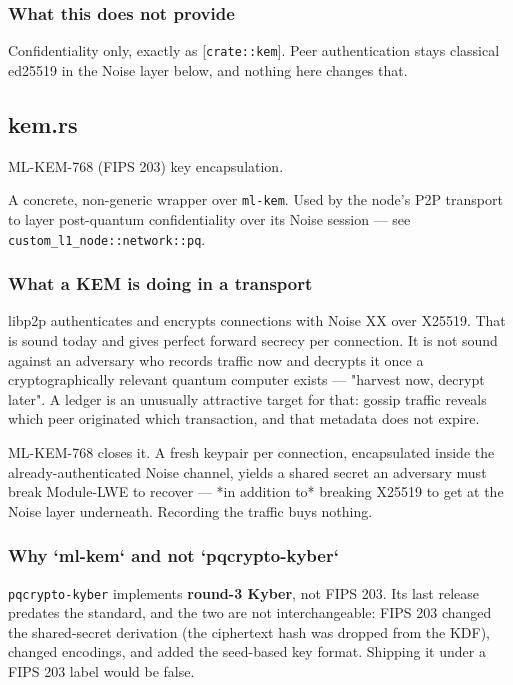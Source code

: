 \documentclass[11pt,a4paper]{article}
\begin{document}
\subsubsection{What this does not provide}

Confidentiality only, exactly as [\texttt{crate::kem}]. Peer authentication stays
classical ed25519 in the Noise layer below, and nothing here changes that.

\subsection{kem.rs}
ML-KEM-768 (FIPS 203) key encapsulation.

A concrete, non-generic wrapper over \texttt{ml-kem}. Used by the node's P2P
transport to layer post-quantum confidentiality over its Noise session —
see \texttt{custom\_l1\_node::network::pq}.

\subsubsection{What a KEM is doing in a transport}

libp2p authenticates and encrypts connections with Noise XX over X25519.
That is sound today and gives perfect forward secrecy per connection. It is
not sound against an adversary who records traffic now and decrypts it once
a cryptographically relevant quantum computer exists — "harvest now, decrypt
later". A ledger is an unusually attractive target for that: gossip traffic
reveals which peer originated which transaction, and that metadata does not
expire.

ML-KEM-768 closes it. A fresh keypair per connection, encapsulated inside
the already-authenticated Noise channel, yields a shared secret an adversary
must break Module-LWE to recover — *in addition to* breaking X25519 to get
at the Noise layer underneath. Recording the traffic buys nothing.

\subsubsection{Why `ml-kem` and not `pqcrypto-kyber`}

\texttt{pqcrypto-kyber} implements \textbf{round-3 Kyber}, not FIPS 203. Its last
release predates the standard, and the two are not interchangeable: FIPS 203
changed the shared-secret derivation (the ciphertext hash was dropped from
the KDF), changed encodings, and added the seed-based key format. Shipping
it under a FIPS 203 label would be false.
\end{document}
